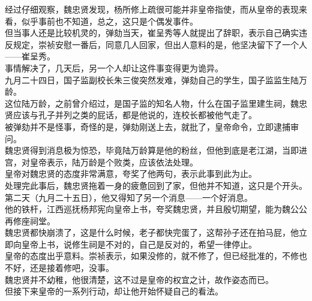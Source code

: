 \begin{multicols}{\theparacolNo}
经过仔细观察，魏忠贤发现，杨所修上疏很可能并非皇帝指使，而从皇帝的表现来看，似乎事前也不知道，总之，这只是个偶发事件。\\

但当事人还是比较机灵的，弹劾当天，崔呈秀等人就提出了辞职，表示自己确实违反规定，崇祯安慰一番后，同意几人回家，但出人意料的是，他坚决留下了一个人——崔呈秀。\\

事情解决了，几天后，另一个人却让这件事变得更为诡异。\\

九月二十四日，国子监副校长朱三俊突然发难，弹劾自己的学生，国子监监生陆万龄。\\

这位陆万龄，之前曾介绍过，是国子监的知名人物，什么在国子监里建生祠，魏忠贤应该与孔子并列之类的屁话，都是他说的，连校长都被他气走了。\\

被弹劾并不是怪事，奇怪的是，弹劾刚送上去，就批了，皇帝命令，立即逮捕审问。\\

魏忠贤得到消息极为惊恐，毕竟陆万龄算是他的粉丝，但他到底是老江湖，当即进宫，对皇帝表示，陆万龄是个败类，应该依法处理。\\

皇帝对魏忠贤的态度非常满意，夸奖了他两句，表示此事到此为止。\\

处理完此事后，魏忠贤拖着一身的疲惫回到了家，但他并不知道，这只是个开头。\\

第二天（九月二十五日），他又得知了另一个消息——一个好消息。\\

他的铁杆，江西巡抚杨邦宪向皇帝上书，夸奖魏忠贤，并且殷切期望，能为魏公公再修座祠堂。\\

魏忠贤都快崩溃了，这是什么时候，老子都快完蛋了，这帮孙子还在拍马屁，他立即向皇帝上书，说修生祠是不对的，自己是反对的，希望一律停止。\\

皇帝的态度出乎意料。崇祯表示，如果没修的，就不修了，但已经批准的，不修也不好，还是接着修吧，没事。\\

魏忠贤并不幼稚，他很清楚，这不过是皇帝的权宜之计，故作姿态而已。\\

但接下来皇帝的一系列行动，却让他开始怀疑自己的看法。\\


\end{multicols}
